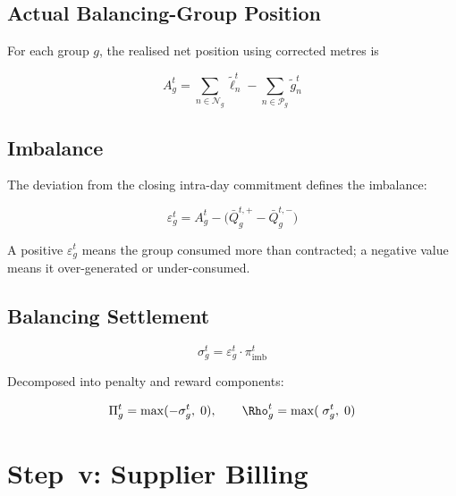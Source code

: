 \documentclass[12pt,a4paper]{article}
\begin{document}
\subsection{Actual Balancing-Group Position}

For each group $g$, the realised net position using corrected metres is

\begin{equation}
A_{g}^{t} =
  \sum_{n \in \mathcal{N}_{g}} \tilde{\ell}_{n}^{t}
  - \sum_{n \in \mathcal{P}_{g}} \tilde{g}_{n}^{t}
\label{eq:bg_actual}
\end{equation}

\subsection{Imbalance}

The deviation from the closing intra-day commitment defines the imbalance:

\begin{equation}
\varepsilon_{g}^{t} = A_{g}^{t} - \bigl(\bar{Q}_{g}^{t,+} - \bar{Q}_{g}^{t,-}\bigr)
\label{eq:imbalance}
\end{equation}

A positive $\varepsilon_{g}^{t}$ means the group consumed more than
contracted; a negative value means it over-generated or under-consumed.

\subsection{Balancing Settlement}

\begin{equation}
\sigma_{g}^{t} = \varepsilon_{g}^{t} \cdot \pi_{\mathrm{imb}}^{t}
\label{eq:balancing_settlement}
\end{equation}

Decomposed into penalty and reward components:

\begin{equation}
\Pi_{g}^{t} = \max(-\sigma_{g}^{t},\;0), \qquad
\Rho_{g}^{t} = \max(\;\sigma_{g}^{t},\;0)
\label{eq:penalty_reward}
\end{equation}

\section{Step~v: Supplier Billing}
\end{document}
